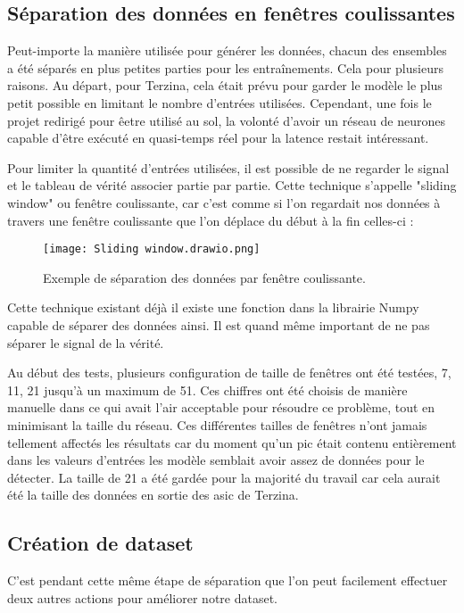 \subsection{Séparation des données en fenêtres coulissantes}

Peut-importe la manière utilisée pour générer les données, chacun des ensembles a été séparés en plus petites parties pour les entraînements.
Cela pour plusieurs raisons.  Au départ, pour Terzina, cela était prévu pour garder le modèle le plus petit possible en limitant le nombre d'entrées
utilisées. Cependant, une fois le projet redirigé pour êetre utilisé au sol, la volonté d'avoir un réseau de neurones 
capable d'être exécuté en quasi-temps réel pour la latence restait intéressant. 

Pour limiter la quantité d'entrées utilisées, il est possible de ne regarder le signal et le tableau de vérité associer partie par partie.
Cette technique s'appelle "sliding window" ou fenêtre coulissante, car c'est comme si l'on regardait nos données à travers une fenêtre coulissante
que l'on déplace du début à la fin celles-ci :
\newpage
\begin{figure}[tbph!]
	\centering
	\texttt{[image: Sliding window.drawio.png]}
	\caption[Exemple de séparation des données par fenêtre coulissante]{Exemple de séparation des données par fenêtre coulissante.}
\end{figure}

Cette technique existant déjà il existe une fonction dans la librairie Numpy capable de séparer des données ainsi.
Il est quand même important de ne pas séparer le signal de la vérité. 

Au début des tests, plusieurs configuration de taille de fenêtres ont été testées, 7, 11, 21 jusqu'à un maximum de 51. 
Ces chiffres ont été choisis de manière manuelle dans ce qui avait l'air acceptable pour résoudre ce problème,
tout en minimisant la taille du réseau. Ces différentes tailles de fenêtres n'ont jamais tellement affectés les résultats 
car du moment qu'un pic était contenu entièrement dans les valeurs d'entrées les modèle semblait avoir assez de données pour le détecter.
La taille de 21 a été gardée pour la majorité du travail car cela aurait été la taille des données en sortie des \gls{asic} de Terzina.

\subsection{Création de dataset}
C'est pendant cette même étape de séparation que l'on peut facilement effectuer deux autres actions pour améliorer notre dataset.

